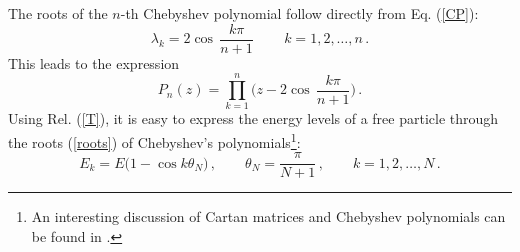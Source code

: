 \documentclass[12pt,a4paper]{article}
\numberwithin{equation}{section}
\theoremstyle{theorem}
\theoremstyle{remark}
\begin{document}
The roots of the $n$-th Chebyshev polynomial follow directly from Eq. (\ref{CP}):
\begin{equation}\label{roots}
    \lambda_k=2\cos\, \frac{k\pi}{n+1}\,\qquad k=1,2,\ldots, n\,.
\end{equation}
This leads to the expression 
\begin{equation}
    P_n(z)=\prod_{k=1}^n\Big(z-2\cos\,\frac{k\pi}{n+1}\Big)\,.
\end{equation}
Using Rel. (\ref{T}), it is easy  to express the energy levels of a free  particle through the roots (\ref{roots}) of Chebyshev's polynomials\footnote{An interesting discussion of Cartan matrices and Chebyshev polynomials can be found in \cite{damianou2011characteristic}.}:
\begin{equation}
    E_k=E\big(1-\cos k\theta_N\big)\,, \qquad \theta_N=\frac{\pi}{N+1}\,,\qquad k=1,2,\ldots, N\,.
\end{equation}
\end{document}
